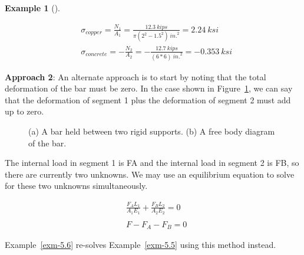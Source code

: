 \documentclass[
  letterpaper,
  DIV=11,
  numbers=noendperiod]{scrreprt}
\theoremstyle{definition}
\newtheorem{example}{Example}[chapter]
\theoremstyle{remark}
\begin{document}
\begin{tcolorbox}
\begin{example}[]
\begin{tcolorbox}
\[
\begin{aligned}
& \sigma_{copper}=\frac{N_1}{A_1}=\frac{12.3{~kips}}{\pi(2^2-1.5^2){~in.}^2}=2.24 {~ksi} \\
& \sigma_{concrete}=-\frac{N_2}{A_2}=-\frac{12.7{~kips}}{(6 * 6){~in.}^2}=-0.353 {~ksi}
\end{aligned}
\]

\end{tcolorbox}

\end{example}

\end{tcolorbox}

\textbf{Approach 2}: An alternate approach is to start by noting that
the total deformation of the bar must be zero. In the case shown in
Figure~\ref{fig-5.12}, we can say that the deformation of segment 1 plus
the deformation of segment 2 must add up to zero.

\begin{figure}


\caption{\label{fig-5.12}(a) A bar held between two rigid supports. (b)
A free body diagram of the bar.}

\end{figure}%

The internal load in segment 1 is FA and the internal load in segment 2
is FB, so there are currently two unknowns. We may use an equilibrium
equation to solve for these two unknowns simultaneously.

\[
\begin{aligned} & \frac{F_A L_1}{A_1 E_1}+\frac{F_B L_2}{A_2 E_2}=0 \\
\\
 & F-F_A-F_B=0\end{aligned}
\]

Example~\ref{exm-5.6} re-solves Example~\ref{exm-5.5} using this method
instead.
\end{document}
